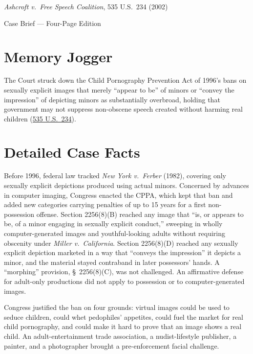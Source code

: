 \documentclass[12pt]{article}
\begin{document}
\begin{center}
{\LARGE \textit{Ashcroft v.\ Free Speech Coalition}, 535 U.S.\ 234 (2002)\par}
\vspace{0.8em}
{\large Case Brief --- Four-Page Edition\par}
\end{center}
\vspace{1em}

\section{Memory Jogger}

The Court struck down the Child Pornography Prevention Act of 1996's bans on sexually explicit images that merely ``appear to be'' of minors or ``convey the impression'' of depicting minors as substantially overbroad, holding that government may not suppress non-obscene speech created without harming real children (\href{https://supreme.justia.com/cases/federal/us/535/234/}{535 U.S.\ 234}).

\section{Detailed Case Facts}

Before 1996, federal law tracked \textit{New York v.\ Ferber} (1982), covering only sexually explicit depictions produced using actual minors. Concerned by advances in computer imaging, Congress enacted the CPPA, which kept that ban and added new categories carrying penalties of up to 15 years for a first non-possession offense. Section 2256(8)(B) reached any image that ``is, or appears to be, of a minor engaging in sexually explicit conduct,'' sweeping in wholly computer-generated images and youthful-looking adults without requiring obscenity under \textit{Miller v.\ California}. Section 2256(8)(D) reached any sexually explicit depiction marketed in a way that ``conveys the impression'' it depicts a minor, and the material stayed contraband in later possessors' hands. A ``morphing'' provision, \S~2256(8)(C), was not challenged. An affirmative defense for adult-only productions did not apply to possession or to computer-generated images.

Congress justified the ban on four grounds: virtual images could be used to seduce children, could whet pedophiles' appetites, could fuel the market for real child pornography, and could make it hard to prove that an image shows a real child. An adult-entertainment trade association, a nudist-lifestyle publisher, a painter, and a photographer brought a pre-enforcement facial challenge.
\end{document}
